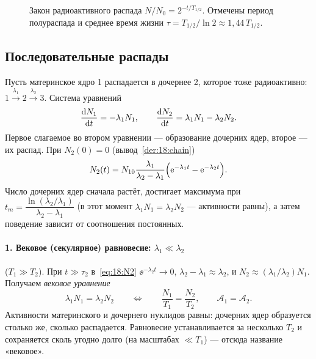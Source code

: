 \begin{figure}[htbp]
\centering
{}
\caption{Закон радиоактивного распада $N/N_0=2^{-t/T_{1/2}}$. Отмечены период полураспада и среднее время жизни
$\tau=T_{1/2}/\ln2\approx1{,}44\,T_{1/2}$.}
\label{fig:18:decay}
\end{figure}

\subsection{Последовательные распады}

Пусть материнское ядро 1 распадается в дочернее 2, которое тоже радиоактивно: $1\xrightarrow{\lambda_1}2\xrightarrow{\lambda_2}3$.
Система уравнений
\begin{equation}\label{eq:18:chain}
  \frac{\mathrm{d} N_1}{\mathrm{d} t}=-\lambda_1N_1,\qquad \frac{\mathrm{d} N_2}{\mathrm{d} t}=\lambda_1N_1-\lambda_2N_2 .
\end{equation}
Первое слагаемое во втором уравнении — образование дочерних ядер, второе — их распад. При $N_2(0)=0$
(вывод~\ref{der:18:chain})
\begin{equation}\label{eq:18:N2}
  N_2(t)=N_{10}\frac{\lambda_1}{\lambda_2-\lambda_1}\Bigl(\mathrm{e}^{-\lambda_1t}-\mathrm{e}^{-\lambda_2t}\Bigr).
\end{equation}
Число дочерних ядер сначала растёт, достигает максимума при $t_m=\dfrac{\ln(\lambda_2/\lambda_1)}{\lambda_2-\lambda_1}$ (в этот момент
$\lambda_1N_1=\lambda_2N_2$ — активности равны), а затем поведение зависит от соотношения постоянных.

\paragraph{1. Вековое (секулярное) равновесие: $\lambda_1\ll\lambda_2$} ($T_1\gg T_2$). При $t\gg\tau_2$ в~\eqref{eq:18:N2} $\ee^{-\lambda_2t}\to0$,
$\lambda_2-\lambda_1\approx\lambda_2$, и $N_2\approx(\lambda_1/\lambda_2)N_1$. Получаем \emph{вековое уравнение}
\begin{equation}\label{eq:18:secular}
  \boxed{\lambda_1N_1=\lambda_2N_2}\qquad\Longleftrightarrow\qquad \frac{N_1}{T_1}=\frac{N_2}{T_2},\qquad \mathcal A_1=\mathcal A_2 .
\end{equation}
Активности материнского и дочернего нуклидов равны: дочерних ядер образуется столько же, сколько распадается.
Равновесие устанавливается за несколько $T_2$ и сохраняется сколь угодно долго (на масштабах $\ll T_1$) — отсюда
название «вековое».

